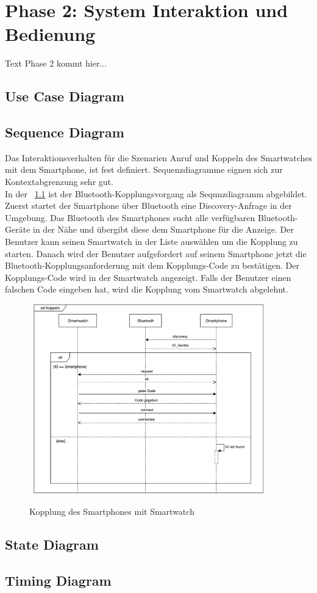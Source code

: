\chapter{Phase 2: System Interaktion und Bedienung}

Text Phase 2 kommt hier...

\section{Use Case Diagram}

\section{Sequence Diagram}
Das Interaktionsverhalten für die Szenarien Anruf und Koppeln des Smartwatches mit dem Smartphone, ist fest definiert. Sequenzdiagramme eignen sich zur Kontextabgrenzung sehr gut.\\
In der ~\ref{fig:kopplung} ist der Bluetooth-Kopplungsvorgang als Sequnzdiagramm abgebildet.
Zuerst startet der Smartphone über Bluetooth eine Discovery-Anfrage in der Umgebung.
Das Bluetooth des Smartphones sucht alle verfügbaren Bluetooth-Geräte in der Nähe und übergibt diese dem Smartphone für die Anzeige.
Der Benutzer kann seinen Smartwatch in der Liste auswählen um die Kopplung zu starten.
Danach wird der Benutzer aufgefordert auf seinem Smartphone jetzt die Bluetooth-Kopplungsanforderung mit dem Kopplungs-Code zu bestätigen. Der Kopplungs-Code wird in der Smartwatch angezeigt.
Falls der Benutzer einen falschen Code eingeben hat, wird die Kopplung vom Smartwatch 
abgelehnt.

\begin{figure}[H]
\centering\
\includegraphics[width=10cm]{img/KoppelnSequenz}
\caption{Kopplung des Smartphones mit Smartwatch}\label{fig:kopplung}
\end{figure}






\section{State Diagram}

\section{Timing Diagram}

